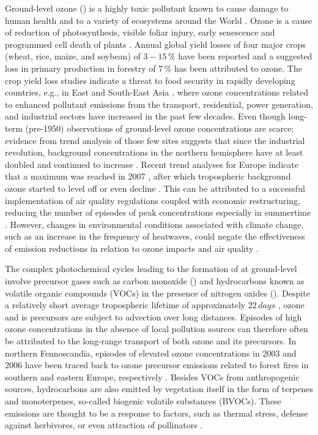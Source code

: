 \documentclass[bg, manuscript]{copernicus}
\begin{document}
Ground-level ozone () is a highly toxic pollutant known to cause damage to human health \citep{WHO2008} and to a variety of ecosystems around the World \citep{PT:Emberson2020}. Ozone is a cause of reduction of photosynthesis, visible foliar injury, early senescence and programmed cell death of plants \citep{PCE:Kangasjarvi2005}. Annual global yield losses of four major crops (wheat, rice, maize, and soybean) of $3-15\,\unit{\%}$ have been reported \citep{PJ:Ainsworth2017} and a suggested loss in primary production in forestry of $7\,\unit{\%}$ \citep{GCB:Wittig2009,EP:Matyssek2012} has been attributed to ozone.
The crop yield loss studies indicate a threat to food security in rapidly developing countries, e.g., in East and South-East Asia \citep{GCB:Tang2013,NCC:Tai2014,AE:Chuwah2015,GCB:Mills2018}, where ozone concentrations related to enhanced pollutant emissions from the transport, residential, power generation, and industrial sectors have increased in the past few decades. Even though long-term (pre-1950) observations of ground-level ozone concentrations are scarce; evidence from trend analysis of those few sites suggests that since the industrial revolution, background concentrations in the northern hemisphere have at least doubled and continued to increase \citep{IPCC2013}. Recent trend analyses for Europe indicate that a maximum was reached in 2007 \citep{AE:Derwent2018}, after which tropospheric background ozone started to level off or even decline \citep{ESA:Cooper2014, ACP:Wespes2018,ESA:Gaudel2018}. This can be attributed to a successful implementation of air quality regulations coupled with economic restructuring, reducing the number of episodes of peak concentrations especially in summertime \citep[e.g.,][]{ESA:Fleming2018, ESA:Mills2018}. However, changes in environmental conditions associated with climate change, such as an increase in the frequency of heatwaves, could negate the effectiveness of emission reductions in relation to ozone impacts and air quality \citep{NCC:Lin2020}.

The complex photochemical cycles leading to the formation of  at ground-level involve precursor gases such as carbon monoxide () and hydrocarbons known as volatile organic compounds (VOCs) in the presence of nitrogen oxides (). Despite a relatively short average tropospheric lifetime of approximately $22\,\unit{days}$ \citep{JGR:Stevenson2005,ACP:Young2013}, ozone and is precursors are subject to advection over long distances. Episodes of high ozone concentrations in the absence of local pollution sources can therefore often be attributed to the long-range transport of both ozone and its precursors. In northern Fennoscandia, episodes of elevated ozone concentrations in 2003 and 2006 have been traced back to ozone precursor emissions related to forest fires in southern and eastern Europe, respectively \citep{AE:Lindskog2007,EP:Karlsson2013}. Besides VOCs from anthropogenic sources, hydrocarbons are also emitted by vegetation itself in the form of terpenes and monoterpenes, so-called biogenic volatile substances (BVOCs). These emissions are thought to be a response to factors, such as thermal stress, defense against herbivores, or even attraction of pollinators \citep{TPS:Penuelas2003}. 
\end{document}
